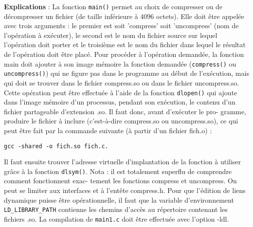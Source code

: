 \documentclass[a4paper,12pt]{article}
\begin{document}
\textbf{Explications} : La fonction \texttt{main()} permet au choix de compresser ou de
décompresser un fichier (de taille inférieure à 4096 octets).
Elle doit être appelée avec trois arguments : le premier est soit 'compress'
soit 'uncompress' (nom de l'opération à exécuter), le second est le nom du fichier
source sur lequel l'opération doit porter et le troisième est le nom du fichier
dans lequel le résultat de l'opération doit être placé.
Pour procéder à l'opération demandée, la fonction main doit ajouter à son
image mémoire la fonction demandée (\texttt{compress()} ou \texttt{uncompress()}) qui ne
figure pas dans le programme au début de l'exécution, mais qui doit se trouver
dans le fichier compress.so ou dans le fichier uncompress.so.
Cette opération peut être effectuée à l'aide de la fonction \texttt{dlopen()} qui
ajoute dans l'image mémoire d'un processus, pendant son exécution, le contenu
d'un fichier partageable d'extension .so. Il faut donc, avant d'exécuter le pro-
gramme, produire le fichier à inclure (c'est-à-dire compress.so ou uncompress.so),
ce qui peut être fait par la commande suivante (à partir d'un fichier fich.o) :
\begin{verbatim}
gcc -shared -o fich.so fich.c.
\end{verbatim}
Il faut ensuite trouver l'adresse virtuelle d'implantation de la fonction à
utiliser grâce à la fonction \texttt{dlsym()}.
Nota : il est totalement superflu de comprendre comment fonctionnent exac-
tement les fonctions compress et uncompress. On peut se limiter aux interfaces
et à l'entête compress.h.
Pour que l'édition de liens dynamique puisse être opérationnelle, il faut que
la variable d'environnement \verb#LD_LIBRARY_PATH# contienne les chemins d'accès
au répertoire contenant les fichiers .so. La compilation de \texttt{main1.c} doit être
effectuée avec l'option -ldl.

\begin{comment}
Correction :
Les lignes complétées sont (dans l'ordre) :
operation(buffer_in, length_in, buffer_out, &length_out);
write(out, buffer_out, sizeof(UBYTE)*length_out);
sprintf(partageable, "%
if ((so_handle = dlopen(partageable,RTLD_LAZY)) == NULL)
dlsym(so_handle, function);
operation = loader(argv[1]);
treatment(argv[2], argv[3]);
dlopen() permet d'ouvrir la bibliothèque dynamique. RTLD_LAZY indique que les
symboles doivent être résolus quand c'est nécessaire (et non pas immédiatement).
dlsym() cherche un symbole dans une bibliothèque dynamique ouverte. 
\end{comment}
\end{document}

